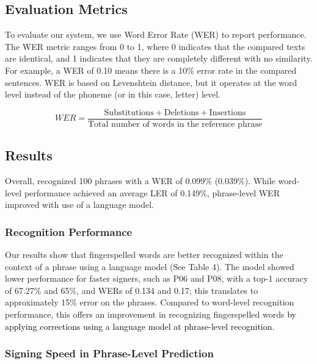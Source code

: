 \subsection{Evaluation Metrics}
To evaluate our system, we use Word Error Rate (WER) to report performance. The WER metric ranges from 0 to 1, where 0 indicates that the compared texts are identical, and 1 indicates that they are completely different with no similarity. For example, a WER of 0.10 means there is a 10\% error rate in the compared sentences. WER is based on Levenshtein distance, but it operates at the word level instead of the phoneme (or in this case, letter) level.


\begin{equation}
WER = \frac{{\text{Substitutions} + \text{Deletions} + \text{Insertions}}}{{\text{Total number of words in the reference phrase}}}
\end{equation}








\subsection{Results}
Overall, \theDevice{} recognized 100 phrases with a WER of 0.099\% (0.039\%). While word-level performance achieved an average LER of 0.149\%, phrase-level WER improved with use of a language model. 


\subsubsection{Recognition Performance}
Our results show that fingerspelled words are better recognized within the context of a phrase using a language model (See Table 4). The model showed lower performance for faster signers, such as P06 and P08, with a top-1 accuracy of 67.27\% and 65\%, and WERs of 0.134 and 0.17; this translates to approximately 15\% error on the phrases. Compared to word-level recognition performance, this offers an improvement in recognizing fingerspelled words \textcolor{black}{by applying corrections using a language model at phrase-level recognition.} 



\subsubsection{Signing Speed in Phrase-Level Prediction}

